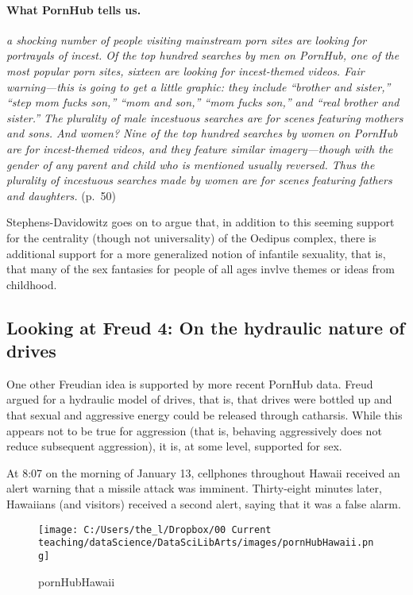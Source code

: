 \documentclass[]{book}
\let\oldparagraph\paragraph
\renewcommand{\paragraph}[1]{\oldparagraph{#1}\mbox{}}
\theoremstyle{definition}
\theoremstyle{definition}
\theoremstyle{definition}
\theoremstyle{remark}
\begin{document}
\paragraph{What PornHub tells us.}\label{what-pornhub-tells-us.}

\emph{a shocking number of people visiting mainstream porn sites are
looking for portrayals of incest. Of the top hundred searches by men on
PornHub, one of the most popular porn sites, sixteen are looking for
incest-themed videos. Fair warning---this is going to get a little
graphic: they include ``brother and sister,'' ``step mom fucks son,''
``mom and son,'' ``mom fucks son,'' and ``real brother and sister.'' The
plurality of male incestuous searches are for scenes featuring mothers
and sons. And women? Nine of the top hundred searches by women on
PornHub are for incest-themed videos, and they feature similar
imagery---though with the gender of any parent and child who is
mentioned usually reversed. Thus the plurality of incestuous searches
made by women are for scenes featuring fathers and daughters.} (p.~50)

Stephens-Davidowitz goes on to argue that, in addition to this seeming
support for the centrality (though not universality) of the Oedipus
complex, there is additional support for a more generalized notion of
infantile sexuality, that is, that many of the sex fantasies for people
of all ages invlve themes or ideas from childhood.

\subsection{Looking at Freud 4: On the hydraulic nature of
drives}\label{looking-at-freud-4-on-the-hydraulic-nature-of-drives}

One other Freudian idea is supported by more recent PornHub data. Freud
argued for a hydraulic model of drives, that is, that drives were
bottled up and that sexual and aggressive energy could be released
through catharsis. While this appears not to be true for aggression
(that is, behaving aggressively does not reduce subsequent aggression),
it is, at some level, supported for sex.

At 8:07 on the morning of January 13, cellphones throughout Hawaii
received an alert warning that a missile attack was imminent.
Thirty-eight minutes later, Hawaiians (and visitors) received a second
alert, saying that it was a false alarm.

\begin{figure}
\centering
\texttt{[image: C:/Users/the\_l/Dropbox/00 Current teaching/dataScience/DataSciLibArts/images/pornHubHawaii.png]}
\caption{pornHubHawaii}
\end{figure}
\end{document}

